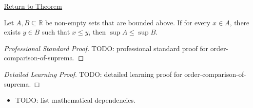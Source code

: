 \newpage
{}
\label{prf:order-comparison-of-suprema}

\begin{remark*}[Return]
\hyperref[prop:order-comparison-of-suprema]{Return to Theorem}
\end{remark*}

\begin{proposition*}
Let $A, B \subseteq \mathbb{R}$ be non-empty sets that are bounded above. If for every $x \in A$, there exists $y \in B$ such that $x \le y$, then $\sup A \le \sup B$.
\end{proposition*}

\begin{proof}[Professional Standard Proof]
\LRAProofBodyStart
TODO: professional standard proof for order-comparison-of-suprema.
\end{proof}

\begin{proof}[Detailed Learning Proof]
\LRAProofBodyStart
TODO: detailed learning proof for order-comparison-of-suprema.
\end{proof}

\begin{remark*}
\end{remark*}

\begin{dependencies}
\begin{itemize}
  \item TODO: list mathematical dependencies.
\end{itemize}
\end{dependencies}

\clearpage
